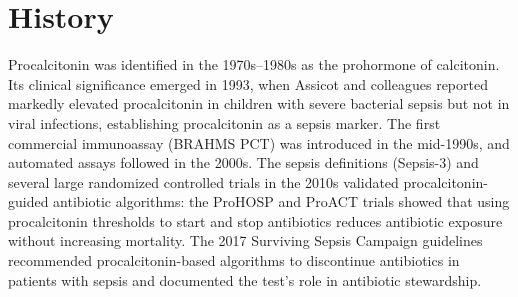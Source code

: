 \section*{History}
Procalcitonin was identified in the 1970s--1980s as the prohormone of calcitonin. Its clinical significance emerged in 1993, when Assicot and colleagues reported markedly elevated procalcitonin in children with severe bacterial sepsis but not in viral infections, establishing procalcitonin as a sepsis marker. The first commercial immunoassay (BRAHMS PCT) was introduced in the mid-1990s, and automated assays followed in the 2000s. The sepsis definitions (Sepsis-3) and several large randomized controlled trials in the 2010s validated procalcitonin-guided antibiotic algorithms: the ProHOSP and ProACT trials showed that using procalcitonin thresholds to start and stop antibiotics reduces antibiotic exposure without increasing mortality. The 2017 Surviving Sepsis Campaign guidelines recommended procalcitonin-based algorithms to discontinue antibiotics in patients with sepsis and documented the test's role in antibiotic stewardship.

